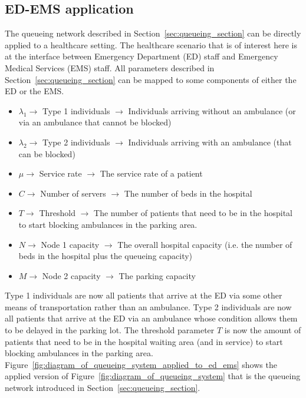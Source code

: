 \subsection{ED-EMS application}\label{sec:queueing_ems_es_application}

The queueing network described in Section~\ref{sec:queueing_section} can be
directly applied to a healthcare setting.
The healthcare scenario that is of interest here is at the interface between
Emergency Department (ED) staff and Emergency Medical Services (EMS) staff.
All parameters described in Section~\ref{sec:queueing_section} can be mapped
to some components of either the ED or the EMS.

\begin{itemize}
    \item \(\lambda_1 \rightarrow\) Type 1 individuals \(\rightarrow\)
    Individuals arriving without an ambulance (or via an ambulance that cannot
    be blocked)
    \item \(\lambda_2 \rightarrow\) Type 2 individuals \(\rightarrow\)
    Individuals arriving with an ambulance (that can be blocked)
    \item \(\mu \rightarrow\) Service rate \(\rightarrow\) The service rate of a
    patient
    \item \(C \rightarrow\) Number of servers \(\rightarrow\) The number of
    beds in the hospital
    \item \(T \rightarrow\) Threshold \(\rightarrow\) The number of patients that
    need to be in the hospital to start blocking ambulances in the parking area.
    \item \(N \rightarrow\) Node 1 capacity \(\rightarrow\) The overall hospital
    capacity (i.e. the number of beds in the hospital plus the queueing
    capacity)
    \item \(M \rightarrow\) Node 2 capacity \(\rightarrow\) The parking capacity
\end{itemize}

Type 1 individuals are now all patients that arrive at the ED via
some other means of transportation rather than an ambulance.
Type 2 individuals are now all patients that arrive at the ED via an ambulance
whose condition allows them to be delayed in the parking lot.
The threshold parameter \(T\) is now the amount of patients that need to be in
the hospital waiting area (and in service) to start blocking ambulances in the
parking area.
Figure~\ref{fig:diagram_of_queueing_system_applied_to_ed_ems} shows the applied
version of Figure~\ref{fig:diagram_of_queueing_system} that is the queueing
network introduced in Section~\ref{sec:queueing_section}.

